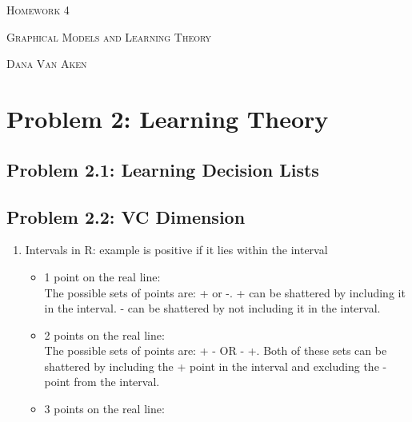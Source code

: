 \documentclass{article}
\begin{document}
\section*{}
\begin{center}
  \centerline{\textsc{\LARGE Homework 4}}
  \vspace{0.5em}
  \centerline{\textsc{Graphical Models and Learning Theory}}
  \vspace{1em}
  \textsc{\large Dana Van Aken} \\
\end{center}

\section*{Problem 2: Learning Theory}

\subsection*{Problem 2.1: Learning Decision Lists}

\subsection*{Problem 2.2: VC Dimension}

\begin{enumerate}

\item Intervals in R: example is positive if it lies within the interval
\begin{itemize}

\item 1 point on the real line: \\
The possible sets of points are: + or -. + can be shattered by including it in the interval.
- can be shattered by not including it in the interval.

\item 2 points on the real line: \\
The possible sets of points are:  +  -   OR   -  +.   Both of these sets can be shattered by including the + point in the interval and
excluding the - point from the interval.

\item 3 points on the real line: \\


\end{itemize}

\end{enumerate}
\end{document}
